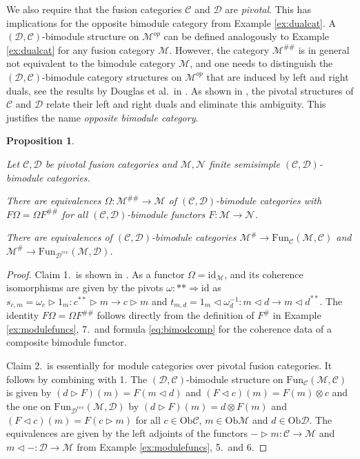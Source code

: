 \documentclass[1.5pt, a4paper]{article}
\newcommand{\mac}{\mathcal C}
\newcommand{\mad}{\mathcal D}
\newcommand{\mam}{\mathcal M}
\newcommand{\man}{\mathcal N}
\newcommand{\Ob}{\mathrm{Ob}}
\newcommand{\Fun}{\mathrm{Fun}}
\newcommand{\inv}[0]{{-1}}
\newcommand{\oo}[0]{\otimes}
\newcommand{\id}[0]{\mathrm{id}}
\newtheorem{proposition}[theorem]{Proposition}
\begin{document}
We also require  that the fusion categories $\mac$ and $\mad$ are {\em pivotal}. This has implications for the opposite bimodule category from Example  \ref{ex:dualcat}. 
 A $(\mad,\mac)$-bimodule structure on $\mam^{op}$ can be defined analogously to Example  \ref{ex:dualcat} for any fusion category $\mam$. However,  the category $\mam^{\#\#}$ is  in general not equivalent to the bimodule category $\mam$, and one needs to distinguish the $(\mad,\mac)$-bimodule category structures on $\mam^{op}$ that are induced by left and right duals, see the results by Douglas et al.~in \cite[Sec.~2.4]{DSS}. As shown in \cite{G14}, the pivotal structures of $\mac$ and $\mad$ relate their left and right duals and  eliminate this ambiguity. This justifies the name {\em opposite bimodule category}.
 

\begin{proposition}\label{ex:oppositebimod} \cite{G14, DSS}

 Let $\mac,\mad$ be pivotal fusion categories  and $\mam,\man$ finite semisimple $(\mac,\mad)$-bimodule categories.
\begin{compactenum}

\item  There are equivalences  $\Omega: \mam^{\#\#}\to \mam$ of $(\mac,\mad)$-bimodule categories with $F\Omega=\Omega F^{\#\#}$ for all $(\mac,\mad)$-bimodule functors $F:\mam\to\man$.

\item There are equivalences of  $(\mac,\mad)$-bimodule categories $\mam^\#\to \Fun_\mac(\mam,\mac)$ and $\mam^\#\to \Fun_{\mad^{rev}}(\mam,\mad)$.
\end{compactenum}
\end{proposition}

\begin{proof}
Claim 1.~is shown in \cite{G14}. As a functor $\Omega=\id_\mam$,  and its coherence isomorphisms are given by the pivots $\omega:**\Rightarrow \id$   as $s_{c,m}=\omega_c\rhd 1_m: c^{**}\rhd m \to c\rhd m$ and $t_{m,d}=1_m\lhd \omega^{\inv}_d: m\lhd d\to m\lhd d^{**}$.  The identity  $F\Omega=\Omega F^{\#\#}$ follows directly from the definition of $F^\#$ in Example \ref{ex:modulefuncs}, 7.~and formula \eqref{eq:bimodcomp} for the coherence data of a composite bimodule functor. 

Claim 2.~is essentially \cite[Prop.~2.4.9]{DSS} for  module categories over pivotal fusion categories. It follows by combining \cite[Prop.~2.4.9]{DSS} with 1.  The  $(\mad,\mac)$-bimodule structure on $\Fun_\mac(\mam,\mac)$  is given by  $(d\rhd F)(m)=F(m\lhd d)$ and $(F\lhd c)(m)=F(m)\oo c$ and  the one on $\Fun_{\mad^{rev}}(\mam,\mad)$ by   $(d\rhd F)(m)=d\oo F(m)$ and $(F\lhd c)(m)=F(c\rhd m)$ for all $c\in\Ob\mac$, $m\in\Ob\mam$ and $d\in\Ob\mad$. The equivalences are given by the left adjoints of the functors $-\rhd m: \mac\to\mam$  and $m\lhd-:\mad\to\mam$ from Example \ref{ex:modulefuncs}, 5.~and 6. 
\end{proof}
\end{document}

